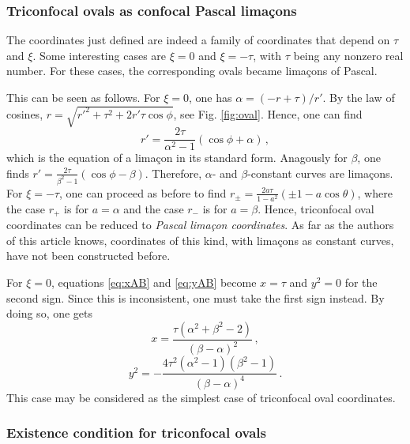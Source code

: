 \documentclass[12pt, ams, nofootinbib]{revtex4}
\def\be{\begin{equation}}
\def\ee{\end{equation}}
\theoremstyle{definition}
\begin{document}
\subsubsection{Triconfocal ovals as confocal Pascal limaçons}
The coordinates just defined are indeed a family of coordinates that depend on $\tau$ and $\xi$. Some interesting cases are $\xi=0$ and $\xi=-\tau$, with $\tau$ being any nonzero real number. For these cases, the corresponding ovals became limaçons of Pascal. 

This can be seen as follows. For $\xi=0$, one has $\alpha = (-r+\tau)/r'$. By the law of cosines, $r=\sqrt{r'^2+\tau^2+2r'\tau\cos\phi}$, see Fig. \ref{fig:oval}. Hence, one can find
\be
	r'=\frac{2\tau}{\alpha^2-1}(\cos\phi + \alpha)\,,
\ee
which is the equation of a limaçon in its standard form. Anagously for $\beta$, one finds $r'=\frac{2\tau}{\beta^2-1}(\cos\phi - \beta)$. Therefore, $\alpha$- and $\beta$-constant curves are limaçons. For $\xi=-\tau$, one can proceed as before to find $r_\pm=\frac{2a\tau}{1-a^2}(\pm 1-a\cos\theta)$, where the case $r_+$ is for $a=\alpha$ and the case $r_-$ is for $a=\beta$. Hence, triconfocal oval coordinates can be reduced to \textit{Pascal limaçon coordinates}. As far as the authors of this article knows, coordinates of this kind, with limaçons as constant curves, have not been constructed before. 

For $\xi=0$, equations \ref{eq:xAB} and \ref{eq:yAB} become $x=\tau$ and $y^2=0$ for the second sign. Since this is inconsistent, one must take the first sign instead. By doing so, one gets
\be
	x=\frac{\tau(\alpha^2+\beta^2-2)}{(\beta-\alpha)^2}\,,
\ee
\be
	y^2=-\frac{4\tau^2(\alpha^2-1)(\beta^2-1)}{(\beta-\alpha)^4}\,.
\ee 
This case may be considered as the simplest case of triconfocal oval coordinates.

\subsubsection{Existence condition for triconfocal ovals}
\end{document}
